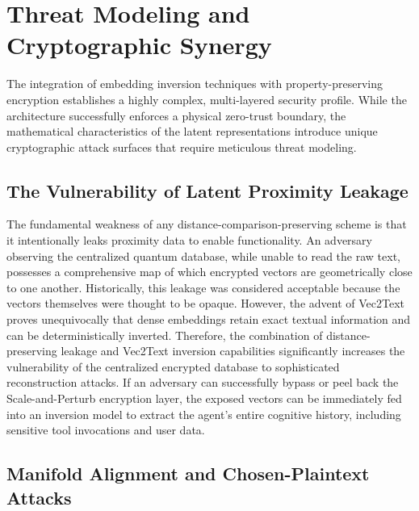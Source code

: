 \documentclass[12pt]{article}
\begin{document}
\section{Threat Modeling and Cryptographic Synergy}

The integration of embedding inversion techniques with property-preserving encryption establishes a highly complex, multi-layered security profile. While the architecture successfully enforces a physical zero-trust boundary, the mathematical characteristics of the latent representations introduce unique cryptographic attack surfaces that require meticulous threat modeling.

\subsection{The Vulnerability of Latent Proximity Leakage}

The fundamental weakness of any distance-comparison-preserving scheme is that it intentionally leaks proximity data to enable functionality. An adversary observing the centralized quantum database, while unable to read the raw text, possesses a comprehensive map of which encrypted vectors are geometrically close to one another. Historically, this leakage was considered acceptable because the vectors themselves were thought to be opaque. However, the advent of Vec2Text proves unequivocally that dense embeddings retain exact textual information and can be deterministically inverted. Therefore, the combination of distance-preserving leakage and Vec2Text inversion capabilities significantly increases the vulnerability of the centralized encrypted database to sophisticated reconstruction attacks. If an adversary can successfully bypass or peel back the Scale-and-Perturb encryption layer, the exposed vectors can be immediately fed into an inversion model to extract the agent's entire cognitive history, including sensitive tool invocations and user data.

\subsection{Manifold Alignment and Chosen-Plaintext Attacks}
\end{document}
